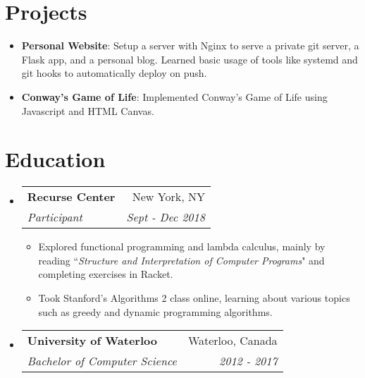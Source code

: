 \documentclass[letterpaper,11pt]{article}
\makeatletter
\newcommand{\resumeItem}[2]{
  \item\small{
    \textbf{#1}{: #2 \vspace{-2pt}}
  }
}
\newcommand{\resumeSubheading}[4]{
  \vspace{-1pt}\item
    \begin{tabular*}{0.97\textwidth}{l@{\extracolsep{\fill}}r}
      \textbf{#1} & #2 \\
      \textit{\small#3} & \textit{\small #4} \\
    \end{tabular*}\vspace{-5pt}
}
\newcommand{\resumeSubItem}[2]{\resumeItem{#1}{#2}\vspace{-4pt}}
\newcommand{\resumeSubHeadingListStart}{\begin{itemize}[leftmargin=*]}
\newcommand{\resumeSubHeadingListEnd}{\end{itemize}}
\newcommand{\resumeItemListStart}{\begin{itemize}}
\newcommand{\resumeItemListEnd}{\end{itemize}\vspace{-5pt}}
\makeatother
\begin{document}
\section{Projects}
  \resumeSubHeadingListStart
    \resumeSubItem{Personal Website}
      {Setup a server with Nginx to serve a private git server, a Flask app, and a personal blog. Learned basic usage of tools like systemd and git hooks to automatically deploy on push.}
    \resumeSubItem{Conway's Game of Life}
      {Implemented Conway's Game of Life using Javascript and HTML Canvas.}
  \resumeSubHeadingListEnd


\section{Education}
  \resumeSubHeadingListStart
    \resumeSubheading
      {Recurse Center}{New York, NY}
      {Participant}{Sept - Dec 2018}
      \resumeItemListStart
        \item {Explored functional programming and lambda calculus, mainly by reading ``\textit{Structure and Interpretation of Computer Programs}" and completing exercises in Racket.}
        \item {Took Stanford's Algorithms 2 class online, learning about various topics such as greedy and dynamic programming algorithms.}
      \resumeItemListEnd
    \resumeSubheading
      {University of Waterloo}{Waterloo, Canada}
      {Bachelor of Computer Science}{2012 - 2017}
  \resumeSubHeadingListEnd

%
\iffalse \section{Programming Skills}
  \resumeSubHeadingListStart
    \item{
      \textbf{Languages}{: Java, JavaScript, Python, SQL}
      \hfill
      \textbf{Tools}{: Spring, vim, git, bash}
    }
  \resumeSubHeadingListEnd
\fi

\end{document}

